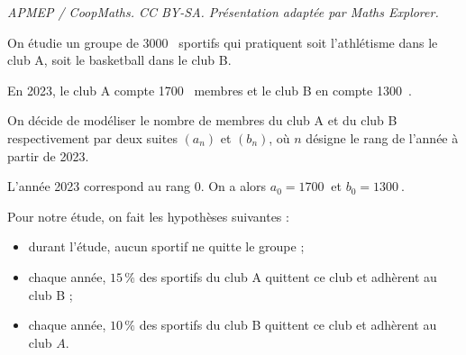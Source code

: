 \documentclass[10pt]{article}
\providecommand{\np}[2][]{{#2~#1}}
\begin{document}
\noindent\textit{APMEP / CoopMaths. CC BY-SA. Présentation adaptée par Maths Explorer.}\par\medskip
\medskip

On étudie un groupe de \np{3000} sportifs qui pratiquent soit l'athlétisme dans le club A, soit le basketball dans le club B.

En 2023, le club A compte \np{1700} membres et le club B en compte \np{1300}.

\smallskip

On décide de modéliser le nombre de membres du club A et du club B respectivement par deux suites $\left(a_{n}\right)$ et $\left(b_{n}\right)$, où $n$ désigne le rang de l'année à partir de 2023.

L'année 2023 correspond au rang 0. On a alors $a_{0}= \np{1700}$ et $b_{0} = \np{1300}$.

Pour notre étude, on fait les hypothèses suivantes :
\begin{itemize}
\item durant l'étude, aucun sportif ne quitte le groupe ;
\item chaque année, $15\,\%$ des sportifs du club A quittent ce club et adhèrent au club B ;
\item chaque année, $10\,\%$ des sportifs du club B quittent ce club et adhèrent au club $A$.
\end{itemize}

\medskip
\end{document}
